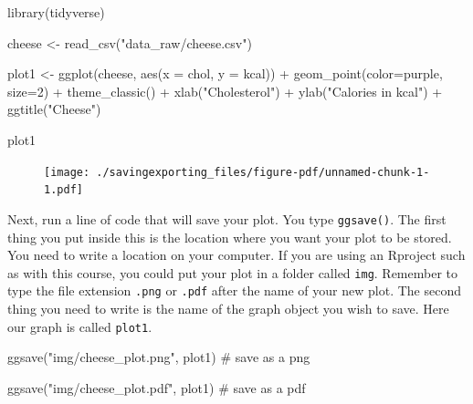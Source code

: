 \documentclass[
  letterpaper,
  DIV=11,
  numbers=noendperiod]{scrreprt}
\newenvironment{Shaded}{\begin{snugshade}}{\end{snugshade}}
\newcommand{\AttributeTok}[1]{\textcolor[rgb]{0.40,0.45,0.13}{#1}}
\newcommand{\CommentTok}[1]{\textcolor[rgb]{0.37,0.37,0.37}{#1}}
\newcommand{\DecValTok}[1]{\textcolor[rgb]{0.68,0.00,0.00}{#1}}
\newcommand{\FunctionTok}[1]{\textcolor[rgb]{0.28,0.35,0.67}{#1}}
\newcommand{\NormalTok}[1]{\textcolor[rgb]{0.00,0.23,0.31}{#1}}
\newcommand{\OtherTok}[1]{\textcolor[rgb]{0.00,0.23,0.31}{#1}}
\newcommand{\SpecialCharTok}[1]{\textcolor[rgb]{0.37,0.37,0.37}{#1}}
\newcommand{\StringTok}[1]{\textcolor[rgb]{0.13,0.47,0.30}{#1}}
\begin{document}
\begin{Shaded}
\begin{Highlighting}[]
\FunctionTok{library}\NormalTok{(tidyverse)}

\NormalTok{cheese }\OtherTok{\textless{}{-}} \FunctionTok{read\_csv}\NormalTok{(}\StringTok{"data\_raw/cheese.csv"}\NormalTok{)}

\NormalTok{plot1 }\OtherTok{\textless{}{-}} \FunctionTok{ggplot}\NormalTok{(cheese, }\FunctionTok{aes}\NormalTok{(}\AttributeTok{x =}\NormalTok{ chol, }\AttributeTok{y =}\NormalTok{ kcal)) }\SpecialCharTok{+} 
     \FunctionTok{geom\_point}\NormalTok{(}\AttributeTok{color=}\StringTok{\textquotesingle{}purple\textquotesingle{}}\NormalTok{, }\AttributeTok{size=}\DecValTok{2}\NormalTok{) }\SpecialCharTok{+} 
     \FunctionTok{theme\_classic}\NormalTok{() }\SpecialCharTok{+}
     \FunctionTok{xlab}\NormalTok{(}\StringTok{"Cholesterol"}\NormalTok{) }\SpecialCharTok{+}
     \FunctionTok{ylab}\NormalTok{(}\StringTok{"Calories in kcal"}\NormalTok{) }\SpecialCharTok{+}
     \FunctionTok{ggtitle}\NormalTok{(}\StringTok{"Cheese"}\NormalTok{)}

\NormalTok{plot1}
\end{Highlighting}
\end{Shaded}

\begin{figure}[H]

{\centering \texttt{[image: ./savingexporting\_files/figure-pdf/unnamed-chunk-1-1.pdf]}

}

\end{figure}

Next, run a line of code that will save your plot. You type
\texttt{ggsave()}. The first thing you put inside this is the location
where you want your plot to be stored. You need to write a location on
your computer. If you are using an Rproject such as with this course,
you could put your plot in a folder called \texttt{img}. Remember to
type the file extension \texttt{.png} or \texttt{.pdf} after the name of
your new plot. The second thing you need to write is the name of the
graph object you wish to save. Here our graph is called \texttt{plot1}.

\begin{Shaded}
\begin{Highlighting}[]
\FunctionTok{ggsave}\NormalTok{(}\StringTok{"img/cheese\_plot.png"}\NormalTok{, plot1)  }\CommentTok{\# save as a png}

\FunctionTok{ggsave}\NormalTok{(}\StringTok{"img/cheese\_plot.pdf"}\NormalTok{, plot1)  }\CommentTok{\# save as a pdf}
\end{Highlighting}
\end{Shaded}
\end{document}
